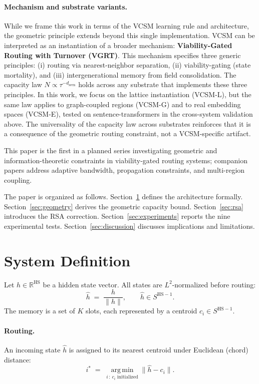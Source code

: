 \documentclass[11pt]{article}
\begin{document}
\paragraph{Mechanism and substrate variants.}
While we frame this work in terms of the VCSM learning rule and architecture, the geometric principle extends beyond this single implementation. VCSM can be interpreted as an instantiation of a broader mechanism: \textbf{Viability-Gated Routing with Turnover (VGRT)}. This mechanism specifies three generic principles: (i) routing via nearest-neighbor separation, (ii) viability-gating (state mortality), and (iii) intergenerational memory from field consolidation. The capacity law $N \propto \tau^{-d_{\text{seen}}}$ holds across any substrate that implements these three principles. In this work, we focus on the lattice instantiation (VCSM-L), but the same law applies to graph-coupled regions (VCSM-G) and to real embedding spaces (VCSM-E), tested on sentence-transformers in the cross-system validation above. The universality of the capacity law across substrates reinforces that it is a consequence of the geometric routing constraint, not a VCSM-specific artifact.

This paper is the first in a planned series investigating geometric and information-theoretic constraints in viability-gated routing systems; companion papers address adaptive bandwidth, propagation constraints, and multi-region coupling.

The paper is organized as follows.
Section~\ref{sec:system} defines the architecture formally.
Section~\ref{sec:geometry} derives the geometric capacity bound.
Section~\ref{sec:rsa} introduces the RSA correction.
Section~\ref{sec:experiments} reports the nine experimental tests.
Section~\ref{sec:discussion} discusses implications and limitations.

\section{System Definition}
\label{sec:system}

Let $h \in \mathbb{R}^{\mathrm{HS}}$ be a hidden state vector.
All states are $L^2$-normalized before routing:
\[
  \hat{h} \;=\; \frac{h}{\|h\|},
  \qquad \hat{h} \in S^{\mathrm{HS}-1}.
\]
The memory is a set of $K$ slots, each represented by a centroid
$c_i \in S^{\mathrm{HS}-1}$.

\paragraph{Routing.}
An incoming state $\hat{h}$ is assigned to its nearest centroid under
Euclidean (chord) distance:
\[
  i^* \;=\; \operatorname*{arg\,min}_{i \,:\, c_i \text{ initialized}}
  \|\hat{h} - c_i\|.
\]
\end{document}
